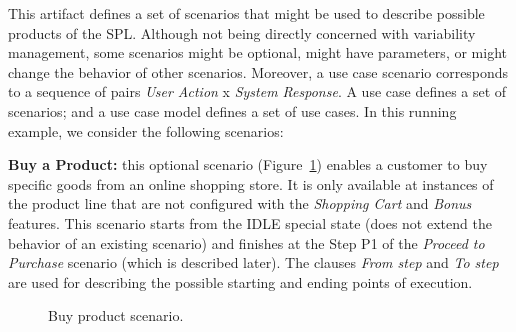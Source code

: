 \documentclass{report}
\begin{document}
\begin{frontmatter}
This artifact defines a set of scenarios that might be used to describe possible
products of the SPL. Although not being directly concerned with variability
management, some scenarios might be optional, might have parameters, or might
change the behavior of other scenarios. Moreover, a use case scenario corresponds
to a sequence of pairs \emph{User Action} x \emph{System Response}.  A use case
defines a set of scenarios; and a use case model defines a set of use cases. In
this running example, we consider the following scenarios:

{\bf Buy a Product:} this optional scenario
(Figure~\ref{fig:buy-product-scenario}) enables a customer to buy specific goods
from an online shopping store. It is only available at instances of the product
line that are not configured with the \emph{Shopping Cart} and \emph{Bonus}
features. This scenario starts from the IDLE special state  (does not extend the
behavior of an existing scenario) and finishes at the Step P1 of the
\emph{Proceed to Purchase} scenario (which is described later). The clauses
\emph{From step} and \emph{To step} are used for describing the possible starting
and ending points of execution.

\begin{figure}[h]
\nocaptionrule \caption{Buy product scenario.}
\label{fig:buy-product-scenario}
\end{figure}



\end{frontmatter}
\end{document}

